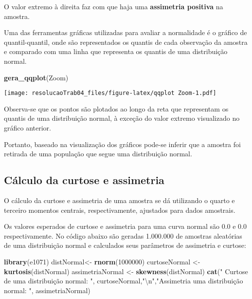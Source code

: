\documentclass[
]{article}
\newenvironment{Shaded}{\begin{snugshade}}{\end{snugshade}}
\newcommand{\CharTok}[1]{\textcolor[rgb]{0.31,0.60,0.02}{#1}}
\newcommand{\DecValTok}[1]{\textcolor[rgb]{0.00,0.00,0.81}{#1}}
\newcommand{\KeywordTok}[1]{\textcolor[rgb]{0.13,0.29,0.53}{\textbf{#1}}}
\newcommand{\NormalTok}[1]{#1}
\newcommand{\StringTok}[1]{\textcolor[rgb]{0.31,0.60,0.02}{#1}}
\begin{document}
O valor extremo à direita faz com que haja uma \textbf{assimetria
positiva} na amostra.

Uma das ferramentas gráficas utilizadas para avaliar a normalidade é o
gráfico de quantil-quantil, onde são representados os quantis de cada
observação da amostra e comparado com uma linha que representa os
quantis de uma distribuição normal.

\begin{Shaded}
\begin{Highlighting}[]
\KeywordTok{gera_qqplot}\NormalTok{(Zoom)}
\end{Highlighting}
\end{Shaded}

\texttt{[image: resolucaoTrab04\_files/figure-latex/qqplot Zoom-1.pdf]}

Observa-se que os pontos são plotados ao longo da reta que representam
os quantis de uma distribuição normal, à exceção do valor extremo
visualizado no gráfico anterior.

Portanto, baseado na visualização dos gráficos pode-se inferir que a
amostra foi retirada de uma população que segue uma distribuição normal.

\hypertarget{cuxe1lculo-da-curtose-e-assimetria}{%
\subsection{Cálculo da curtose e
assimetria}\label{cuxe1lculo-da-curtose-e-assimetria}}

O cálculo da curtose e assimetria de uma amostra se dá utilizando o
quarto e terceiro momentos centrais, respectivamente, ajustados para
dados amostrais.

Os valores esperados de curtose e assimetria para uma curva normal são
0.0 e 0.0 respectivamente. No código abaixo são geradas 1.000.000 de
amostras aleatórias de uma distribuição normal e calculados seus
parâmetros de assimetria e curtose:

\begin{Shaded}
\begin{Highlighting}[]
\KeywordTok{library}\NormalTok{(e1071)}
\NormalTok{distNormal<-}\StringTok{ }\KeywordTok{rnorm}\NormalTok{(}\DecValTok{1000000}\NormalTok{)}
\NormalTok{curtoseNormal <-}\StringTok{ }\KeywordTok{kurtosis}\NormalTok{(distNormal)}
\NormalTok{assimetriaNormal <-}\StringTok{ }\KeywordTok{skewness}\NormalTok{(distNormal)}
\KeywordTok{cat}\NormalTok{(}\StringTok{" Curtose de uma distribuição normal: "}\NormalTok{, }
\NormalTok{    curtoseNormal,}\StringTok{"}\CharTok{\textbackslash{}n}\StringTok{"}\NormalTok{,}\StringTok{"Assimetria uma distribuição normal: "}\NormalTok{, }
\NormalTok{    assimetriaNormal)}
\end{Highlighting}
\end{Shaded}
\end{document}
